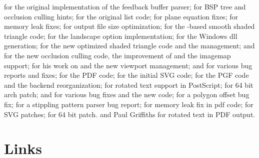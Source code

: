  for the original implementation of
the feedback buffer parser; 
%
 for BSP tree and occlusion
culling hints;
%
 for the original list
code;
%
 for plane equation
fixes; 
%
 for memory leak fixes;
%
 for output file size optimization;
%
 for the -based smooth shaded
triangle code;
%
 for the landscape option
implementation;
%
 for the Windows dll generation;
%
 for the new optimized
shaded triangle code and the  management;
%
 and  for the new occlusion culling code, the
improvement of  and the imagemap support;
%
 for his work on
 and the new viewport management;
%
 and  for various bug reports and fixes;
%
 for the PDF code;
%
 for the initial SVG code;
%
 for the PGF code and the
backend reorganization;
%
 for rotated text support in
PostScript;
%
 for 64 bit arch patch;
%
 and  for various bug fixes and the new
 code;
%
 for a polygon offset bug
fix;
%
 for a
stippling pattern parser bug report;
%
 for memory leak fix
in pdf code;
%
 for SVG patches;
%
 for 64 bit patch.
%
 and Paul Griffiths for
rotated text in PDF output.

\section{Links}
\label{sec:links}

